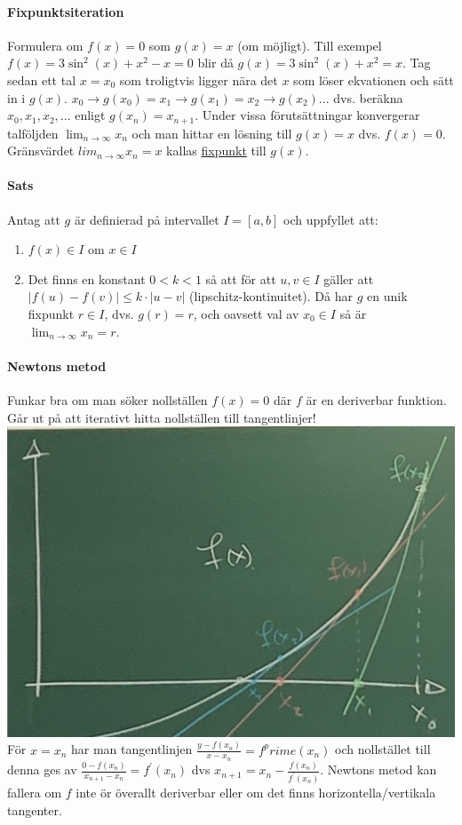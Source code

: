 \paragraph{Fixpunktsiteration} Formulera om $f(x)=0$ som $g(x)=x$ (om möjligt).
Till exempel $f(x)=3\sin^2(x)+x^2-x=0$ blir då $g(x)=3\sin^2(x)+x^2=x$.
Tag sedan ett tal $x=x_0$ som troligtvis ligger nära det $x$ som löser ekvationen och sätt in i $g(x)$.
$x_0\rightarrow g(x_0)=x_1\rightarrow g(x_1)=x_2\rightarrow g(x_2)...$ dvs. beräkna $x_0,x_1,x_2,...$ enligt $g(x_n)=x_{n+1}$.
Under vissa förutsättningar konvergerar talföljden $\lim_{n\to\infty}x_n$ och man hittar en lösning till $g(x)=x$ dvs. $f(x)=0$.
Gränsvärdet $lim_{n\to\infty}x_n=x$ kallas \underline{fixpunkt} till $g(x)$.

\paragraph{Sats} Antag att $g$ är definierad på intervallet $I=[a,b]$ och uppfyllet att:
\begin{enumerate}
    \item $f(x)\in I$ om $x\in I$
    \item Det finns en konstant $0<k<1$ så att för att $u,v\in I$ gäller att $|f(u)-f(v)|\leq k\cdot|u-v|$ (lipschitz-kontinuitet).
          Då har $g$ en unik fixpunkt $r\in I$, dvs. $g(r)=r$, och oavsett val av $x_0\in I$ så är $\lim_{n\to\infty}x_n=r$.
\end{enumerate}

\paragraph{Newtons metod} Funkar bra om man söker nollställen $f(x)=0$ där $f$ är en deriverbar funktion.
Går ut på att iterativt hitta nollställen till tangentlinjer!\\
\includegraphics[scale=0.1]{lessons/lesson10/imgs/img03.jpg}\\
För $x=x_n$ har man tangentlinjen $\frac{y-f(x_n)}{x-x_n}=f^prime(x_n)$ och nollstället till denna ges av $\frac{0-f(x_n)}{x_{n+1}-x_n}=f^\prime(x_n)$ dvs $x_{n+1}=x_n-\frac{f(x_n)}{f^\prime(x_n)}$.
Newtons metod kan fallera om $f$ inte ör överallt deriverbar eller om det finns horizontella/vertikala tangenter.

